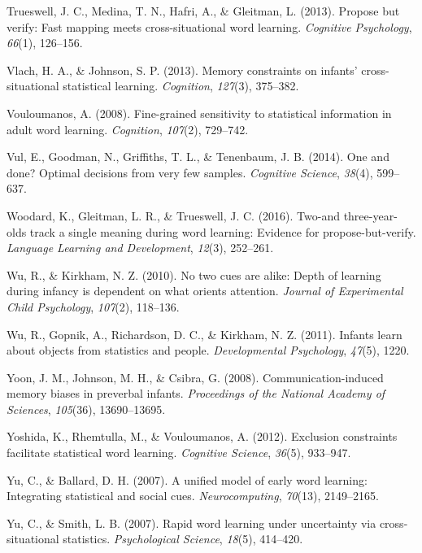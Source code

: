 \documentclass[authoryear, review]{elsarticle}
\begin{document}
\hypertarget{ref-trueswell2013propose}{}
Trueswell, J. C., Medina, T. N., Hafri, A., \& Gleitman, L. (2013).
Propose but verify: Fast mapping meets cross-situational word learning.
\emph{Cognitive Psychology}, \emph{66}(1), 126--156.

\hypertarget{ref-vlach2013memory}{}
Vlach, H. A., \& Johnson, S. P. (2013). Memory constraints on infants'
cross-situational statistical learning. \emph{Cognition}, \emph{127}(3),
375--382.

\hypertarget{ref-vouloumanos2008fine}{}
Vouloumanos, A. (2008). Fine-grained sensitivity to statistical
information in adult word learning. \emph{Cognition}, \emph{107}(2),
729--742.

\hypertarget{ref-vul2014}{}
Vul, E., Goodman, N., Griffiths, T. L., \& Tenenbaum, J. B. (2014). One
and done? Optimal decisions from very few samples. \emph{Cognitive
Science}, \emph{38}(4), 599--637.

\hypertarget{ref-woodard2016two}{}
Woodard, K., Gleitman, L. R., \& Trueswell, J. C. (2016). Two-and
three-year-olds track a single meaning during word learning: Evidence
for propose-but-verify. \emph{Language Learning and Development},
\emph{12}(3), 252--261.

\hypertarget{ref-wu2010no}{}
Wu, R., \& Kirkham, N. Z. (2010). No two cues are alike: Depth of
learning during infancy is dependent on what orients attention.
\emph{Journal of Experimental Child Psychology}, \emph{107}(2),
118--136.

\hypertarget{ref-wu2011infants}{}
Wu, R., Gopnik, A., Richardson, D. C., \& Kirkham, N. Z. (2011). Infants
learn about objects from statistics and people. \emph{Developmental
Psychology}, \emph{47}(5), 1220.

\hypertarget{ref-yoon2008communication}{}
Yoon, J. M., Johnson, M. H., \& Csibra, G. (2008). Communication-induced
memory biases in preverbal infants. \emph{Proceedings of the National
Academy of Sciences}, \emph{105}(36), 13690--13695.

\hypertarget{ref-yoshida2012exclusion}{}
Yoshida, K., Rhemtulla, M., \& Vouloumanos, A. (2012). Exclusion
constraints facilitate statistical word learning. \emph{Cognitive
Science}, \emph{36}(5), 933--947.

\hypertarget{ref-yu2007unified}{}
Yu, C., \& Ballard, D. H. (2007). A unified model of early word
learning: Integrating statistical and social cues.
\emph{Neurocomputing}, \emph{70}(13), 2149--2165.

\hypertarget{ref-yu2007rapid}{}
Yu, C., \& Smith, L. B. (2007). Rapid word learning under uncertainty
via cross-situational statistics. \emph{Psychological Science},
\emph{18}(5), 414--420.
\end{document}

